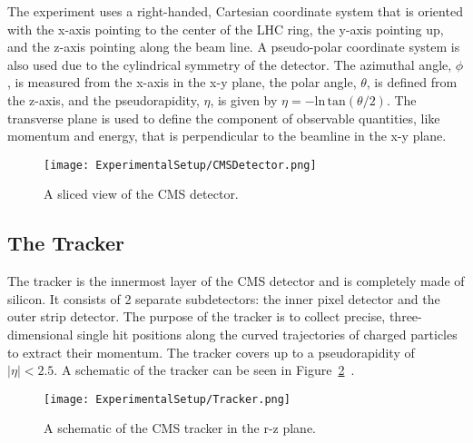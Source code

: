 The experiment uses a right-handed, Cartesian coordinate system that is oriented with the x-axis pointing to the center of the LHC ring, the y-axis pointing up, and the z-axis pointing along the beam line. A pseudo-polar coordinate system is also used due to the cylindrical symmetry of the detector. The azimuthal angle, $\phi$, is measured from the x-axis in the x-y plane, the polar angle, $\theta$, is defined from the z-axis, and the pseudorapidity, $\eta$, is given by $\eta = -\mathrm{ln}\, \mathrm{tan}(\theta/2)$. The transverse plane is used to define the component of observable quantities, like momentum and energy, that is perpendicular to the beamline in the x-y plane. 

\begin{figure}[htbp]
\texttt{[image: ExperimentalSetup/CMSDetector.png]}
\caption{A sliced view of the CMS detector.}
\label{fig:CMSDetector}
\end{figure}

\subsection{The Tracker}
The tracker is the innermost layer of the CMS detector and is completely made of silicon. It consists of 2 separate subdetectors: the inner pixel detector and the outer strip detector. The purpose of the tracker is to collect precise, three-dimensional single hit positions along the curved trajectories of charged particles to extract their momentum. The tracker covers up to a pseudorapidity of $\mid\eta\mid < 2.5$. A schematic of the tracker can be seen in Figure~\ref{fig:CMSTracker}~\cite{CMSExperiment}. 

\begin{figure}[htbp]
\begin{center}
\texttt{[image: ExperimentalSetup/Tracker.png]}
\end{center}
\caption{A schematic of the CMS tracker in the r-z plane.}
\label{fig:CMSTracker}
\end{figure}


